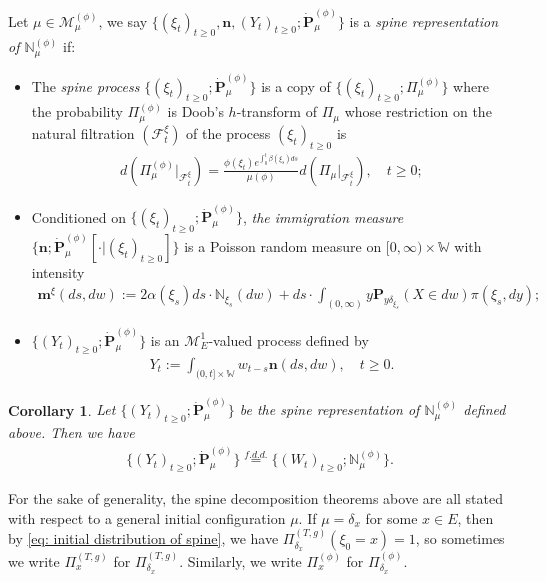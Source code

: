 \documentclass[12pt,a4paper]{amsart}
\newtheorem{cro}[thm]{Corollary}
\theoremstyle{definition}
\numberwithin{equation}{section}
\begin{document}
Let $\mu \in \mathcal M^{(\phi)}_\mu$, we say $\{(\xi_t)_{t\geq 0}, \mathbf n, (Y_t)_{ t\geq 0}; \dot {\mathbf P}^{(\phi)}_\mu\}$ is a \emph{spine representation of $\mathbb N^{(\phi)}_\mu$} if:
\begin{itemize}
\item
	The \emph{spine process} $\{(\xi_t)_{t\geq 0}; \dot{\mathbf P}^{(\phi)}_\mu\}$ is a copy of $\{(\xi_t)_{t\geq 0}; \Pi^{(\phi)}_{\mu}\}$ where the probability $\Pi_{\mu}^{(\phi)}$ is Doob's $h$-transform of $\Pi_\mu$ whose restriction on the natural filtration $(\mathscr F_t^\xi)$ of the process $(\xi_t)_{t\geq 0}$ is
  \begin{align}
    d(\Pi_{\mu}^{(\phi)} |_{\mathscr F_t^\xi})
    = \frac{\phi(\xi_t)e^{\int_0^t \beta(\xi_s)ds}}{\mu(\phi)} d(\Pi_{\mu} |_{\mathscr F_t^\xi}),
    \quad t\geq 0;
  \end{align}
\item
	Conditioned on $\{(\xi_t)_{t\geq 0}; \dot{\mathbf P}^{(\phi)}_\mu\}$, \emph{the immigration measure} $\{\mathbf n; \dot{\mathbf P}^{(\phi)}_\mu[\cdot |(\xi_t)_{t\geq 0}]\}$ is a Poisson random measure on $[0,\infty ) \times \mathbb W$ with intensity
  \begin{align}\label{eq:meanMeasImmigr}
    \mathbf m^\xi(ds,dw)
    := 2 \alpha(\xi_s) ds \cdot \mathbb N_{\xi_s}(dw) + ds \cdot \int_{(0,\infty)} y \mathbf P_{y\delta_{\xi_s}}(X\in dw) \pi(\xi_s,dy);
  \end{align}
\item
	$\{(Y_t)_{t\geq 0}; \dot{\mathbf P}^{(\phi)}_\mu\}$ is an $\mathcal M^1_E$-valued process defined by
  \begin{align}\label{eq:defSpinImmigr}
    Y_t
    := \int_{(0,t] \times \mathbb W} w_{t-s} \mathbf n(ds,dw),
    \quad t\geq 0.
  \end{align}
\end{itemize}

\begin{cro}
	Let $\{(Y_t)_{t\geq 0}; \dot {\mathbf P}^{(\phi)}_\mu\}$ be the spine representation of $\mathbb N^{(\phi)}_\mu$ defined above.
	Then we have
  \begin{align}
    \{(Y_t)_{t\geq 0}; \dot{\mathbf P}^{(\phi)}_\mu\}
    \overset{f.d.d.}{=} \{(W_t)_{t\geq 0}; \mathbb N_\mu^{(\phi)}\}.
  \end{align}
\end{cro}

For the sake of generality, the spine decomposition theorems above are all stated with respect to a general initial configuration $\mu$.
If $\mu = \delta_x$ for some $x\in E$, then by \eqref{eq: initial distribution of spine}, we have $\Pi_{\delta_x}^{(T,g)} (\xi_0 = x) = 1$, so sometimes we write $\Pi_x^{(T,g)}$ for $\Pi_{\delta_x}^{(T,g)}$.
Similarly, we write $\Pi_x^{(\phi)}$ for $\Pi_{\delta_x}^{(\phi)}$.
\end{document}
